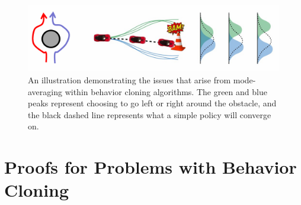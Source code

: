 \begin{flushleft}
    \begin{figure}[H]
        \centering
        \includegraphics[width=0.9\linewidth]{rl/modeavg.png}
        \caption{An illustration demonstrating the issues that arise from mode-averaging within behavior cloning algorithms. The green and blue peaks represent choosing to go left or right around the obstacle, and the black dashed line represents what a simple policy will converge on.}
        \label{fig:modeavg}
    \end{figure}
\end{flushleft}

\section{Proofs for Problems with Behavior Cloning}




